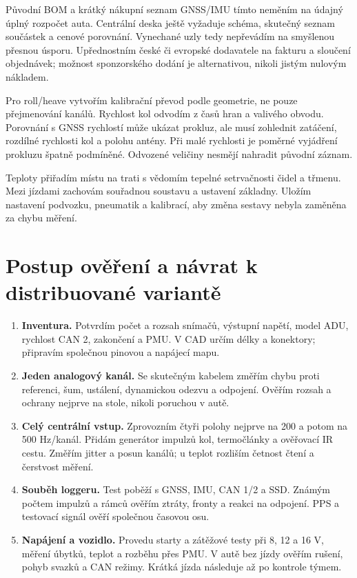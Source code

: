 Původní BOM a krátký nákupní seznam GNSS/IMU tímto neměním na údajný
úplný rozpočet auta. Centrální deska ještě vyžaduje schéma, skutečný
seznam součástek a cenové porovnání. Vynechané uzly tedy nepřevádím
na smyšlenou přesnou úsporu. Upřednostním české či evropské dodavatele
na fakturu a sloučení objednávek; možnost sponzorského dodání je
alternativou, nikoli jistým nulovým nákladem.

Pro roll/heave vytvořím kalibrační převod podle geometrie, ne pouze
přejmenování kanálů. Rychlost kol odvodím z časů hran a valivého obvodu.
Porovnání s GNSS rychlostí může ukázat prokluz, ale musí zohlednit
zatáčení, rozdílné rychlosti kol a polohu antény. Při malé rychlosti
je poměrné vyjádření prokluzu špatně podmíněné. Odvozené veličiny
nesmějí nahradit původní záznam.

Teploty přiřadím místu na trati s vědomím tepelné setrvačnosti čidel
a třmenu. Mezi jízdami zachovám souřadnou soustavu a ustavení základny.
Uložím nastavení podvozku, pneumatik a kalibrací, aby změna sestavy
nebyla zaměněna za chybu měření.

\section{Postup ověření a návrat k distribuované variantě}

\begin{enumerate}
 \item \textbf{Inventura.} Potvrdím počet a rozsah snímačů, výstupní
       napětí, model ADU, rychlost CAN 2, zakončení a PMU. V CAD určím
       délky a konektory; připravím společnou pinovou a napájecí mapu.
 \item \textbf{Jeden analogový kanál.} Se skutečným kabelem změřím
       chybu proti referenci, šum, ustálení, dynamickou odezvu a odpojení.
       Ověřím rozsah a ochrany nejprve na stole, nikoli poruchou v autě.
 \item \textbf{Celý centrální vstup.} Zprovozním čtyři polohy nejprve
       na 200 a potom na 500 Hz/kanál. Přidám generátor impulzů kol,
       termočlánky a ověřovací IR cestu. Změřím jitter a posun kanálů;
       u teplot rozliším četnost čtení a čerstvost měření.
 \item \textbf{Souběh loggeru.} Test poběží s GNSS, IMU, CAN 1/2 a SSD.
       Známým počtem impulzů a rámců ověřím ztráty, fronty a reakci na
       odpojení. PPS a testovací signál ověří společnou časovou osu.
 \item \textbf{Napájení a vozidlo.} Provedu starty a zátěžové testy
       při 8, 12 a 16 V, měření úbytků, teplot a rozběhu přes PMU.
       V autě bez jízdy ověřím rušení, pohyb svazků a CAN režimy.
       Krátká jízda následuje až po kontrole týmem.
\end{enumerate}

